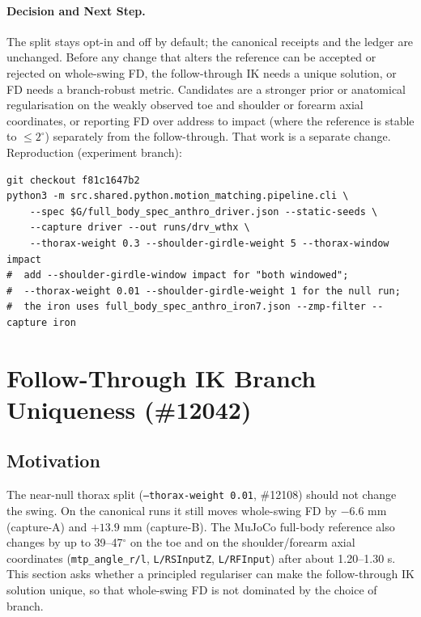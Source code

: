 \documentclass[11pt,a4paper]{article}
\begin{document}
\paragraph{Decision and Next Step.} The split stays opt-in and off by default; the canonical receipts and the ledger are unchanged. Before any change that alters the reference can be accepted or rejected on whole-swing FD, the follow-through IK needs a unique solution, or FD needs a branch-robust metric. Candidates are a stronger prior or anatomical regularisation on the weakly observed toe and shoulder or forearm axial coordinates, or reporting FD over address to impact (where the reference is stable to $\le2^\circ$) separately from the follow-through. That work is a separate change. Reproduction (experiment branch):
\begin{verbatim}
git checkout f81c1647b2
python3 -m src.shared.python.motion_matching.pipeline.cli \
    --spec $G/full_body_spec_anthro_driver.json --static-seeds \
    --capture driver --out runs/drv_wthx \
    --thorax-weight 0.3 --shoulder-girdle-weight 5 --thorax-window impact
#  add --shoulder-girdle-window impact for "both windowed";
#  --thorax-weight 0.01 --shoulder-girdle-weight 1 for the null run;
#  the iron uses full_body_spec_anthro_iron7.json --zmp-filter --capture iron
\end{verbatim}

\section{Follow-Through IK Branch Uniqueness (\#12042)}

\subsection{Motivation}
The near-null thorax split (\texttt{--thorax-weight 0.01}, \#12108) should not
change the swing. On the canonical runs it still moves whole-swing FD by
$-6.6$ mm (capture-A) and $+13.9$ mm (capture-B). The MuJoCo full-body
reference also changes by up to 39--47$^\circ$ on the toe and on the
shoulder/forearm axial coordinates (\texttt{mtp\_angle\_r/l},
\texttt{L/RSInputZ}, \texttt{L/RFInput}) after about 1.20--1.30 s. This
section asks whether a principled regulariser can make the follow-through IK
solution unique, so that whole-swing FD is not dominated by the choice of
branch.
\end{document}
